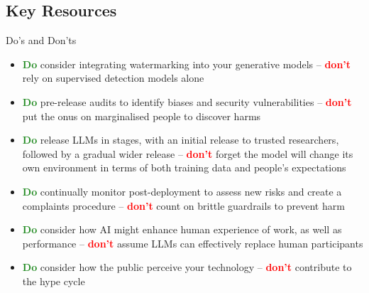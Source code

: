 \subsection{Key Resources}
Do's and Don'ts
\begin{itemize}
    \item \textcolor{ForestGreen}{\textbf{Do}} consider integrating watermarking into your generative models --  \textcolor{red}{\textbf{don't}} rely on supervised detection models alone
    \item \textcolor{ForestGreen}{\textbf{Do}} pre-release audits to identify biases and security vulnerabilities \cite{madnani_building_2017} -- \textcolor{red}{\textbf{don't}} put the onus on marginalised people to discover harms
    
    \item \textcolor{ForestGreen}{\textbf{Do}} release LLMs in stages, with an initial release to trusted researchers, followed by a gradual wider release \cite{solaiman_release_2019} -- \textcolor{red}{\textbf{don't}} forget the model will change its own environment in terms of both training data and people's expectations
    \item \textcolor{ForestGreen}{\textbf{Do}} continually monitor post-deployment to assess new risks and create a complaints procedure \cite{anderljung2023frontier} -- \textcolor{red}{\textbf{don't}} count on brittle guardrails to prevent harm
    \item \textcolor{ForestGreen}{\textbf{Do}} consider how AI might enhance human experience of work, as well as performance -- \textcolor{red}{\textbf{don't}} assume LLMs can effectively replace human participants 
    \item \textcolor{ForestGreen}{\textbf{Do}} consider how the public perceive your technology -- \textcolor{red}{\textbf{don't}} contribute to the hype cycle
 
    
\end{itemize}



